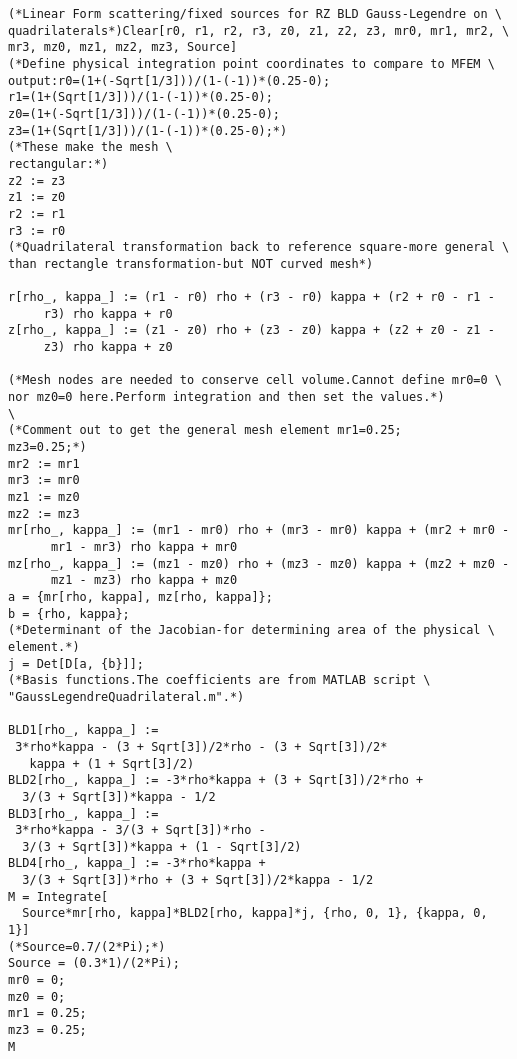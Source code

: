 \documentclass{article}
\begin{document}
\begin{verbatim}
(*Linear Form scattering/fixed sources for RZ BLD Gauss-Legendre on \
quadrilaterals*)Clear[r0, r1, r2, r3, z0, z1, z2, z3, mr0, mr1, mr2, \
mr3, mz0, mz1, mz2, mz3, Source]
(*Define physical integration point coordinates to compare to MFEM \
output:r0=(1+(-Sqrt[1/3]))/(1-(-1))*(0.25-0);
r1=(1+(Sqrt[1/3]))/(1-(-1))*(0.25-0);
z0=(1+(-Sqrt[1/3]))/(1-(-1))*(0.25-0);
z3=(1+(Sqrt[1/3]))/(1-(-1))*(0.25-0);*)
(*These make the mesh \
rectangular:*)
z2 := z3
z1 := z0
r2 := r1
r3 := r0
(*Quadrilateral transformation back to reference square-more general \
than rectangle transformation-but NOT curved mesh*)

r[rho_, kappa_] := (r1 - r0) rho + (r3 - r0) kappa + (r2 + r0 - r1 - 
     r3) rho kappa + r0
z[rho_, kappa_] := (z1 - z0) rho + (z3 - z0) kappa + (z2 + z0 - z1 - 
     z3) rho kappa + z0

(*Mesh nodes are needed to conserve cell volume.Cannot define mr0=0 \
nor mz0=0 here.Perform integration and then set the values.*)
\
(*Comment out to get the general mesh element mr1=0.25;
mz3=0.25;*)
mr2 := mr1
mr3 := mr0
mz1 := mz0
mz2 := mz3
mr[rho_, kappa_] := (mr1 - mr0) rho + (mr3 - mr0) kappa + (mr2 + mr0 -
      mr1 - mr3) rho kappa + mr0
mz[rho_, kappa_] := (mz1 - mz0) rho + (mz3 - mz0) kappa + (mz2 + mz0 -
      mz1 - mz3) rho kappa + mz0
a = {mr[rho, kappa], mz[rho, kappa]};
b = {rho, kappa};
(*Determinant of the Jacobian-for determining area of the physical \
element.*)
j = Det[D[a, {b}]];
(*Basis functions.The coefficients are from MATLAB script \
"GaussLegendreQuadrilateral.m".*)

BLD1[rho_, kappa_] := 
 3*rho*kappa - (3 + Sqrt[3])/2*rho - (3 + Sqrt[3])/2*
   kappa + (1 + Sqrt[3]/2)
BLD2[rho_, kappa_] := -3*rho*kappa + (3 + Sqrt[3])/2*rho + 
  3/(3 + Sqrt[3])*kappa - 1/2
BLD3[rho_, kappa_] := 
 3*rho*kappa - 3/(3 + Sqrt[3])*rho - 
  3/(3 + Sqrt[3])*kappa + (1 - Sqrt[3]/2)
BLD4[rho_, kappa_] := -3*rho*kappa + 
  3/(3 + Sqrt[3])*rho + (3 + Sqrt[3])/2*kappa - 1/2
M = Integrate[
  Source*mr[rho, kappa]*BLD2[rho, kappa]*j, {rho, 0, 1}, {kappa, 0, 1}]
(*Source=0.7/(2*Pi);*)
Source = (0.3*1)/(2*Pi);
mr0 = 0;
mz0 = 0;
mr1 = 0.25;
mz3 = 0.25;
M
\end{verbatim}
\end{document}
